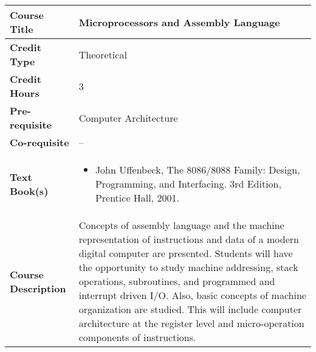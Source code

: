 \documentclass[11pt]{article}
\begin{document}
\begin{table}[h!]
\begin{tabular}{|l|l|}
\hline
\textbf{Course Title}       &  Microprocessors and Assembly Language \\ \hline
\textbf{Credit Type}        &   Theoretical \\ \hline
\textbf{Credit Hours}       & 3  \\ \hline
\textbf{Pre-requisite}       & Computer Architecture \\ \hline
\textbf{Co-requisite}       & -- \\ \hline
\textbf{Text Book(s)}       & \begin{minipage}{.70\textwidth}
\begin{itemize} \itemsep-0.4em
	\vspace{3mm}
	\item John Uffenbeck, The 8086/8088 Family: Design, Programming, and Interfacing. 3rd Edition, Prentice Hall, 2001.
	\vspace{3mm}
\end{itemize}
\end{minipage}\\ \hline
\textbf{Course Description} & \begin{minipage}{.70\textwidth}
\vspace{3mm}
Concepts of assembly language and the machine representation of instructions and
data of a modern digital computer are presented. Students will have the opportunity to study machine
addressing, stack operations, subroutines, and programmed and interrupt driven I/O. Also, basic concepts of
machine organization are studied. This will include computer architecture at the register level and micro-operation components of instructions.
\vspace{3mm}
\end{minipage} \\ \hline
\end{tabular}
\end{table}
\end{document}
